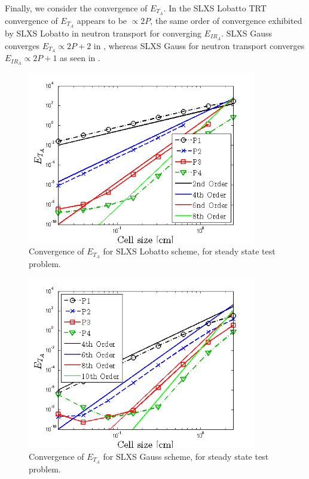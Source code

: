 Finally, we consider the convergence of $E_{T_A}$.  
In  the SLXS Lobatto TRT convergence of $E_{T_A}$ appears to be $\propto 2P$, the same order of convergence exhibited by SLXS Lobatto in neutron transport for converging $E_{IR_A}$.
SLXS Gauss converges $E_{T_A} \propto 2P+2$ in , whereas SLXS Gauss for neutron transport converges $E_{IR_A} \propto 2P+1$ as seen in .
\begin{figure}[!hbp]
\centering
\includegraphics[width=10cm]{chapter6_grey_radtran/Dissertation_Data/Constant_Time_SLXS_Lobatto_temp_A.png}
\caption{Convergence of $E_{T_A}$ for SLXS Lobatto scheme, for steady state test problem.}
\label{fig:constant_time_lobatto_t_a}
\end{figure}
%
%
\begin{figure}[!htp]
\centering
\includegraphics[width=10cm]{chapter6_grey_radtran/Dissertation_Data/Constant_Time_SLXS_Gauss_temp_A.png}
\caption{Convergence of $E_{T_A}$ for SLXS Gauss scheme, for steady state test problem.}
\label{fig:constant_time_gauss_t_a}
\end{figure}


